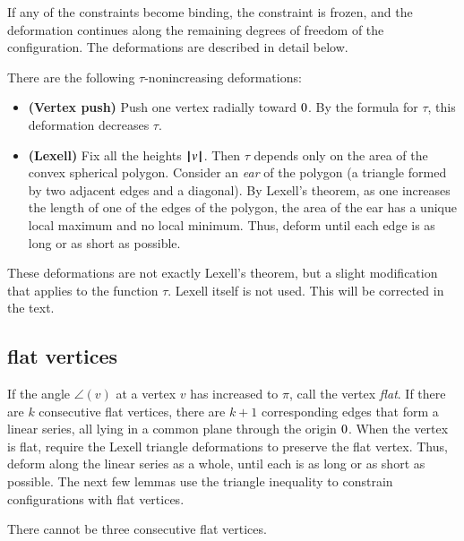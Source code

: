 If any of the constraints become binding, the
constraint is frozen, and the deformation continues along the remaining degrees of freedom of the configuration.  The deformations are described in detail below.
%

There are the following $\tau$-nonincreasing deformations:
\begin{itemize}
\item {\bf (Vertex push)} Push one vertex radially toward $0$.  By the formula for $\tau$, this deformation decreases $\tau$.
\item {\bf (Lexell)} Fix all the heights ${{\hskip0.1em|\hskip-0.15em|\hskip0.1em}v{\hskip0.1em|\hskip-0.15em|\hskip0.1em}}$. Then $\tau$ depends only on the area of the convex spherical polygon.  Consider an {\it ear} of the polygon (a triangle formed by two adjacent edges and a diagonal).  By Lexell's theorem, as one increases the length of one of the edges of the polygon, the area of the ear has a unique local maximum and no local minimum.  Thus,  deform until each edge is as long or as short as possible.
%
%
%
\end{itemize}


\begin{note}%
These deformations are not exactly Lexell's theorem, but a slight modification that applies to the function $\tau$.  Lexell itself is not used.  This will be corrected in the text.  
\end{note}

\subsection{flat vertices}


If the  angle $\angle(v)$ at a vertex $v$ has increased to $\pi$, call the vertex {\it flat}. If there are $k$ consecutive flat vertices, there are  $k+1$ corresponding edges that form a linear series, all lying in a common plane through the origin $0$.  When the vertex is flat, require the Lexell triangle deformations to preserve the flat vertex.  Thus,  deform along the linear series as a whole, until each is as long or as short as possible.  The next few lemmas use the triangle inequality to constrain configurations with flat vertices.
%
%

\begin{lemma}
There cannot be three consecutive flat vertices.
\end{lemma}

